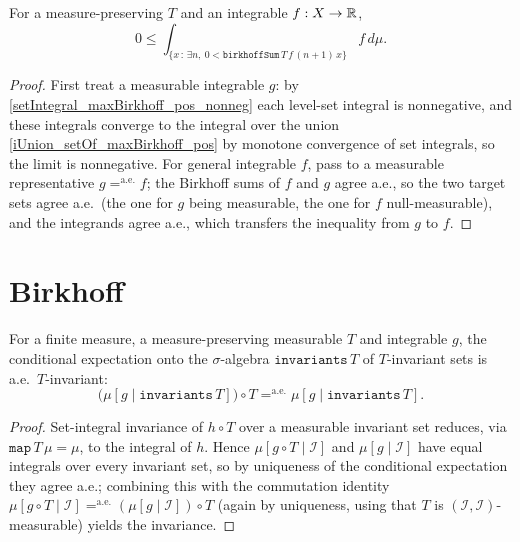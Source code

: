 \begin{theorem}\label{setIntegral_birkhoffSum_pos_nonneg}
  \leanok
  For a measure-preserving \(T\) and an integrable \(f : X \to \mathbb{R}\),
  \[
    0 \le \int_{\{x \,:\, \exists n,\ 0 < \texttt{birkhoffSum}\,T\,f\,(n+1)\,x\}}
      f \, d\mu.
  \]
\end{theorem}
\begin{proof}\leanok
  First treat a measurable integrable \(g\): by
  \cref{setIntegral_maxBirkhoff_pos_nonneg} each level-set integral is
  nonnegative, and these integrals converge to the integral over the union
  \cref{iUnion_setOf_maxBirkhoff_pos} by monotone convergence of set integrals,
  so the limit is nonnegative. For general integrable \(f\), pass to a
  measurable representative \(g =^{\text{a.e.}} f\); the Birkhoff sums of \(f\)
  and \(g\) agree a.e., so the two target sets agree a.e.\ (the one for \(g\)
  being measurable, the one for \(f\) null-measurable), and the integrands
  agree a.e., which transfers the inequality from \(g\) to \(f\).
\end{proof}

\section{Birkhoff}

\begin{theorem}\label{condExp_invariants_comp_self}
  \leanok
  For a finite measure, a measure-preserving measurable \(T\) and integrable
  \(g\), the conditional expectation onto the \(\sigma\)-algebra
  \(\texttt{invariants}\,T\) of \(T\)-invariant sets is a.e.\ \(T\)-invariant:
  \[
    \big(\mu[g \mid \texttt{invariants}\,T]\big) \circ T
      =^{\text{a.e.}} \mu[g \mid \texttt{invariants}\,T].
  \]
\end{theorem}
\begin{proof}\leanok
  Set-integral invariance of \(h \circ T\) over a measurable invariant set
  reduces, via \(\texttt{map}\,T\,\mu = \mu\), to the integral of \(h\). Hence
  \(\mu[g \circ T \mid \mathcal I]\) and \(\mu[g \mid \mathcal I]\) have equal
  integrals over every invariant set, so by uniqueness of the conditional
  expectation they agree a.e.; combining this with the commutation identity
  \(\mu[g\circ T \mid \mathcal I] =^{\text{a.e.}} (\mu[g\mid\mathcal I])\circ T\)
  (again by uniqueness, using that \(T\) is \((\mathcal I,\mathcal I)\)-measurable)
  yields the invariance.
\end{proof}

